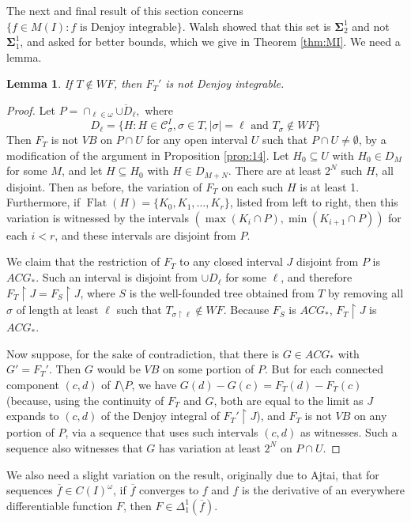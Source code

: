 \documentclass[12pt]{amsart}
\newtheorem{lemma}[theorem]{Lemma}
\newcommand{\uhr}{\upharpoonright}
\renewcommand{\flat}{\operatorname{Flat}}
\newcommand{\august}[1]{#1}%
\begin{document}
The next and final result of this section
concerns $\{f \in M(I) : f \text{ is 
Denjoy integrable}\}$.  Walsh showed that this set is $\mathbf 
\Sigma^1_2$ and not $\mathbf \Sigma^1_1$, and asked for better bounds, 
which we give in Theorem \ref{thm:MI}.  We need a lemma.

\begin{lemma}\label{lem:D_integrable}
If $T \not\in WF$, then $F_T'$ is not Denjoy integrable. 
\end{lemma}
\begin{proof}
Let
$P = \cap_{\ell \in \omega} \overline{ \cup D_\ell},$ where
$$D_\ell 
= \{ H : H \in \mathcal C^I_\sigma, \sigma \in T, |\sigma| = \ell 
\text{ and } T_{\sigma} \not\in WF\}$$
Then $F_T$ is not $VB$ on $P \cap U$ for any open interval $U$ 
such that $P\cap U \neq \emptyset$, by a modification of 
the argument in Proposition \ref{prop:14}.  Let $H_0 \subseteq U$ 
with $H_0 \in D_M$ for some $M$, and let $H\subseteq H_0$ 
with $H\in D_{M+N}$.  There are at least $2^N$ such $H$, all disjoint. 
Then as before, the variation of $F_T$ on each such $H$ is 
at least 1. Furthermore, if $\flat(H) = \{K_0,K_1,\dots, K_r\}$,
listed from left to right, then this variation is witnessed by 
the intervals $(\max (K_i\cap P), \min (K_{i+1}\cap P))$ 
for each $i<r$, and these intervals are disjoint from $P$.

We claim that 
the restriction 
of $F_T$ to any closed interval $J$ disjoint from $P$
is $ACG_\ast$.  Such an interval is disjoint from $\cup D_\ell$ 
for some $\ell$, and therefore $F_T\uhr J = F_S \uhr J$, 
where $S$ is the well-founded tree obtained from $T$ by 
removing all $\sigma$ \august{of length at least $\ell$}
such that $T_{\sigma \uhr \ell} \not\in WF$.
Because $F_S$ is $ACG_\ast$, $F_T \uhr J$ is $ACG_\ast$.

Now suppose, for the sake of contradiction, that there is $G \in ACG_\ast$ 
with $G' = F_T'$.  Then $G$ would be $VB$ on some portion of $P$. 
But for each connected component $(c,d)$ of $I \setminus P$, 
we have $G(d) - G(c) = F_T(d) - F_T(c)$ (because, using the continuity 
 of $F_T$ and $G$, both are equal to the limit as $J$ expands to 
$(c,d)$ of the Denjoy integral of $F_T'\uhr J$), and $F_T$ is not $VB$ on 
any portion of $P$, via a sequence that uses such intervals $(c,d)$ 
as witnesses.  Such a sequence also witnesses that $G$ has 
variation at least $2^N$ on $P \cap U$.
\end{proof}

\august{We also need a slight variation on the result, originally 
due to Ajtai, that for
sequences $\overline f \in C(I)^\omega$, 
if $\overline f$ converges to $f$ and $f$ is the derivative 
of an everywhere differentiable function $F$, then 
$F \in \Delta^1_1(\overline f)$. } 
\end{document}
